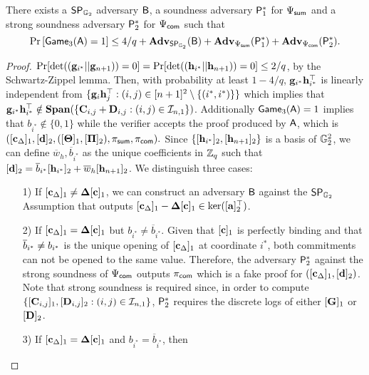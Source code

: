 \begin{lemma} There exists a $\mathsf{SP}_{\mathbb{G}_2}$ adversary $\mathcal{\mathsf{B}}$, a soundness adversary $\mathsf{P}^*_1$  for ${\Psi_{\mathsf{sum}}}$ and 
a strong soundness adversary $\mathsf{P}^*_2$ for ${\Psi_{\mathsf{com}}}$  such that
$$\Pr\left[\mathsf{Game}_3(\mathsf{A})=1\right] \leq 4/q + \mathbf{Adv}_{\mathsf{SP}_{\mathbb{G}_2}}(\mathsf{B}) +
\mathbf{Adv}_{\Psi_{\mathsf{sum}}}(\mathsf{P}^*_1)+\mathbf{Adv}_{\Psi_{\mathsf{com}}}(\mathsf{P}^*_2).$$  
\label{lemma:G3}
\end{lemma}
\begin{proof}
$\Pr[\det((\mathbf{g}_{i^*}||\mathbf{g}_{n+1}))=0]=\Pr[\det((\mathbf{h}_{i^*}||\mathbf{h}_{n+1}))=0]\leq2/q$, by the Schwartz-Zippel lemma. Then, with probability at least $1-4/q$, $\mathbf{g}_{i^*}\mathbf{h}_{i^*}^\top$ is linearly independent from
$\{\mathbf{g}_{i}\mathbf{h}_j^\top:(i,j)\in[n+1]^2\setminus\{(i^*, i^*)\}\}$ which implies that $\mathbf{g}_{i^*}\mathbf{h}_{i^*}^\top\notin\mathbf{Span}(\{\mathbf{{C}}_{i,j}+\mathbf{{D}}_{i,j}:(i,j)\in\mathcal{I}_{n,1}\})$. 
Additionally  $\mathsf{Game}_3(\mathsf{A})=1$ implies that $b_{i^*} \notin \{0,1\}$
while the verifier accepts the proof  produced by $\mathsf{A}$, which is
$ (
        [\mathbf{c}_{\Delta}]_1, [\mathbf{d}]_2,
        ([\mathbf{{\Theta}}]_1, [\mathbf{{\Pi}}]_2), 
        \pi_{\mathsf{sum}},\pi_{\mathsf{com}}
).$ Since $\{[\mathbf{h}_{i^*}]_2,[\mathbf{h}_{n+1}]_2\}$ is a basis of $\mathbb{G}_2^2$,
we can define $\overline{w}_h,\overline{b}_{i^*}$ as the unique coefficients in $\mathbb{Z}_q$ such that $[\mathbf{d}]_2= \overline{b}_{i^*} [\mathbf{h}_{i^*}]_2 + \overline{w}_h [\mathbf{h}_{n+1}]_2$.
We distinguish three cases:
\begin{itemize}
\item[1)] If $[\mathbf{c}_{\Delta}]_1 \neq \mathbf{{\Delta}} [\mathbf{c}]_1$, we can construct an adversary 
$\mathsf{B}$ against the $\mathsf{SP}_{\mathbb{G}_2}$ Assumption that outputs 
$[\mathbf{c}_{\Delta}]_1-\mathbf{{\Delta}} [\mathbf{c}]_1\in\ker([\mathbf{{a}}]_2^\top)$.
\item[2)] If $[\mathbf{c}_{\Delta}]_1 = \mathbf{{\Delta}} [\mathbf{c}]_1$ but $b_{i^*} \neq \overline{b}_{i^*}$. Given that $[\mathbf{c}]_1$ is perfectly binding and that $\overline{b}_{i^*}\neq b_{i^*}$ is the unique opening of $[\mathbf{c}_\Delta]_1$ at coordinate $i^*$, both commitments can not be opened to the same value. Therefore, the adversary $\mathsf{P}^*_2$ against the strong soundness of ${\Psi_{\mathsf{com}}}$
outputs $\pi_{\mathsf{com}}$ which is a fake proof for 
$([\mathbf{c}_\Delta]_1,[\mathbf{d}]_2)$. Note that strong soundness is required since, in order to compute $\{[\mathbf{{C}}_{i,j}]_1,[\mathbf{{D}}_{i,j}]_2:(i,j)\in\mathcal{I}_{n,1}\}$, $\mathsf{P}^*_2$ requires the discrete logs of either $[\mathbf{{G}}]_1$ or $[\mathbf{{D}}]_2$.
\item[3)] If $[\mathbf{c}_{\Delta}]_1 = \mathbf{{\Delta}} [\mathbf{c}]_1$ and $b_{i^*} = \overline{b}_{i^*}$, then 

\end{itemize}
\end{proof}
